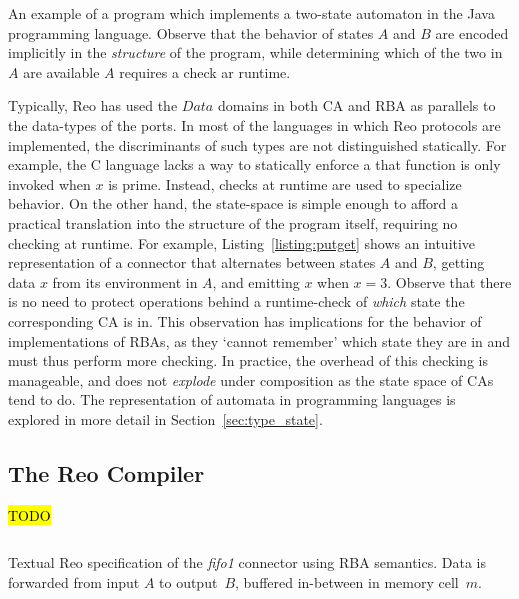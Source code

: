 \begin{listing}[ht]
	\inputminted[]{java}{putget.java}
	\caption[Type state automaton in Java.]{An example of a program which implements a two-state automaton in the Java programming language. Observe that the behavior of states $A$ and $B$ are encoded implicitly in the \textit{structure} of the program, while determining which of the two in $A$ are available $A$ requires a check ar runtime.}
	\label{listing:putget}
\end{listing}
Typically, Reo has used the $Data$ domains in both CA and RBA as parallels to the data-types of the ports. In most of the languages in which Reo protocols are implemented, the discriminants of such types are not distinguished statically. For example, the C language lacks a way to statically enforce a that function  is only invoked when $x$ is prime. Instead, checks at runtime are used to specialize behavior. On the other hand, the state-space is simple enough to afford a practical translation into the structure of the program itself, requiring no checking at runtime. For example, Listing~\ref{listing:putget} shows an intuitive representation of a connector that alternates between states $A$ and $B$, getting data $x$ from its environment in $A$, and emitting $x$ when $x=3$. Observe that there is no need to protect operations behind a runtime-check of \textit{which} state the corresponding CA is in. This observation has implications for the behavior of implementations of RBAs, as they `cannot remember' which state they are in and must thus perform more checking. In practice, the overhead of this checking is manageable, and does not \textit{explode} under composition as the state space of CAs tend to do. The representation of automata in programming languages is explored in more detail in Section~\ref{sec:type_state}.

\subsection{The Reo Compiler}
\hl{TODO}
%
%

\begin{listing}[ht]
	\inputminted[]{text}{fifo1.rba.treo}
	\caption[Fifo1 connector specfication in textual Reo language.]{Textual Reo specification of the \textit{fifo1} connector using RBA semantics. Data is forwarded from input $A$ to output~$B$, buffered in-between in memory cell~$m$.}
	\label{listing:fifo1_treo}
\end{listing}


